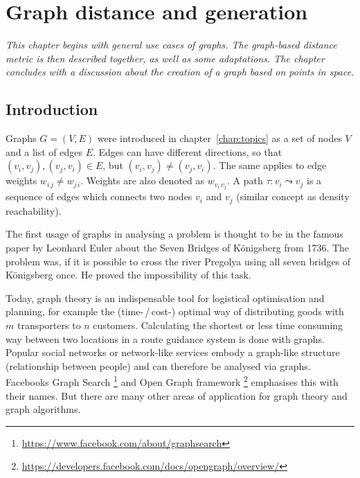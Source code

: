 
\chapter{Graph distance and generation}
\emph{%
This chapter begins with general use cases of graphs. The graph-based distance metric is then described together, as well as some adaptations. The chapter concludes with a discussion about the creation of a graph based on points in space.
}\label{chap:graph}

\section{Introduction}
Graphs $G = (V, E)$ were introduced in chapter~\ref{chap:topics} as a set of nodes $V$ and a list of edges $E$. Edges can have different directions, so that $(v_i, v_j), (v_j, v_i) \in E$, but $(v_i, v_j) \neq (v_j, v_i)$. The same applies to edge weights $w_{i\,j} \neq w_{j\,i}$. Weights are also denoted as $w_{v_i \, v_j}$. A path $\tau: v_i \leadsto v_j$ is a sequence of edges which connects two nodes $v_i$ and $v_j$ (similar concept as density reachability).

The first usage of graphs in analysing a problem is thought to be in the famous paper by Leonhard Euler about the Seven Bridges of Königsberg from 1736. The problem was, if it is possible to cross the river Pregolya using all seven bridges of Königsberg once. He proved the impossibility of this task.

Today, graph theory is an indispensable tool for logistical optimisation and planning, for example the (time-\,/\,cost-) optimal way of distributing goods with $m$ transporters to $n$ customers. Calculating the shortest or less time consuming way between two locations in a route guidance system is done with graphs. Popular social networks or network-like services embody a graph-like structure (relationship between people) and can therefore be analysed via graphs. Facebooks Graph Search%
\footnote{\url{https://www.facebook.com/about/graphsearch}}%
 and Open Graph framework%
 \footnote{\url{https://developers.facebook.com/docs/opengraph/overview/}}%
 emphasises this with their names.
But there are many other areas of application for graph theory and graph algorithms.

\vspace{3em}

